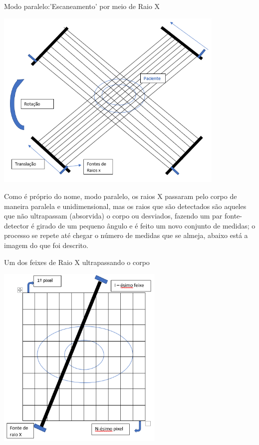 \documentclass[a4paper, 12pt]{article}
\begin{document}
\begin{center}
    \caption{Modo paralelo:'Escaneamento' por meio de Raio X}
    \includegraphics[width=11cm]{Figura1.png}
\end{center}


Como é próprio do nome, modo paralelo, os raios X passaram pelo corpo de maneira paralela e unidimensional, mas os raios que são detectados são aqueles que não ultrapassam (absorvida) o corpo ou desviados, fazendo um par fonte-detector é girado de um pequeno ângulo e é feito um novo conjunto de medidas; o processo se repete até chegar o número de medidas que se almeja, abaixo está a imagem do que foi descrito.

\begin{center}
    \caption{Um dos feixes de Raio X ultrapassando o corpo}
    \includegraphics[width=8cm]{Figura2.png}
\end{center}
\end{document}
